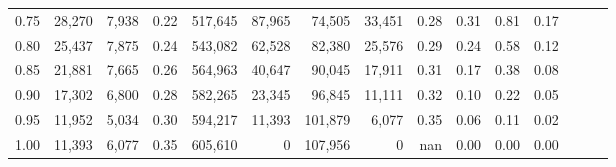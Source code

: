 \begin{tabular}{rrrrrrrrrrrrrrr}
0.75 &  28,270 &  7,938 &  0.22 &  517,645 &   87,965 &   74,505 &   33,451 &  0.28 &  0.31 &  0.81 &      0.17 \\
0.80 &  25,437 &  7,875 &  0.24 &  543,082 &   62,528 &   82,380 &   25,576 &  0.29 &  0.24 &  0.58 &      0.12 \\
0.85 &  21,881 &  7,665 &  0.26 &  564,963 &   40,647 &   90,045 &   17,911 &  0.31 &  0.17 &  0.38 &      0.08 \\
0.90 &  17,302 &  6,800 &  0.28 &  582,265 &   23,345 &   96,845 &   11,111 &  0.32 &  0.10 &  0.22 &      0.05 \\
0.95 &  11,952 &  5,034 &  0.30 &  594,217 &   11,393 &  101,879 &    6,077 &  0.35 &  0.06 &  0.11 &      0.02 \\
1.00 &  11,393 &  6,077 &  0.35 &  605,610 &        0 &  107,956 &        0 &   nan &  0.00 &  0.00 &      0.00 \\
\bottomrule
\end{tabular}
